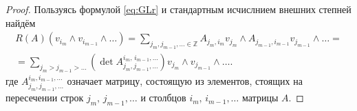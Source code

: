 \documentclass[a4paper,14pt]{extarticle}
\numberwithin{equation}{section}
\begin{document}
\begin{proof}
Пользуясь формулой \eqref{eq:GLr} и стандартным исчислнием внешних степней найдём \begin{multline}
	R(A)\left( v_{i_m}\wedge v_{i_{m-1}}\wedge \ldots	 \right) =\sum_{j_m,j_{m-1},\ldots \in \mathbb{Z}}^{}
	A_{j_m,i_{m}}v_{j_m}\wedge A_{j_{m-1},i_{m-1}} v_{j_{m-1}}\wedge  \ldots	=\\= \sum_{j_m >j_{m-1}> \ldots}^{} \left( 
		\det A_{j_m,j_{m-1},\ldots}^{i_{m},\,i_{m-1},\ldots}\right) v_{j_m} \wedge v_{j_{m-1}}\wedge \ldots
	\label{}
.\end{multline}
где $A^{i_m,i_{m-1},\ldots}_{j_m,j_{m-1},\ldots}$ означает
матрицу, состоящую из элементов, стоящих
на пересечении строк $j_m,\,j_{m-1},\ldots$ и столбцов
$i_m,\,i_{m-1},\ldots$ матрицы $A$.

\end{proof}
\end{document}

